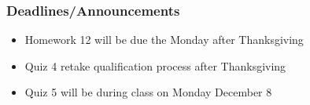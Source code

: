 
\begin{frame}
    \frametitle{Deadlines/Announcements}
\begin{itemize}
            \item Homework 12 will be due the Monday after Thanksgiving
            \item Quiz 4 retake qualification process after Thanksgiving
            \item Quiz 5 will be during class on Monday December 8
        \end{itemize}
\end{frame}
